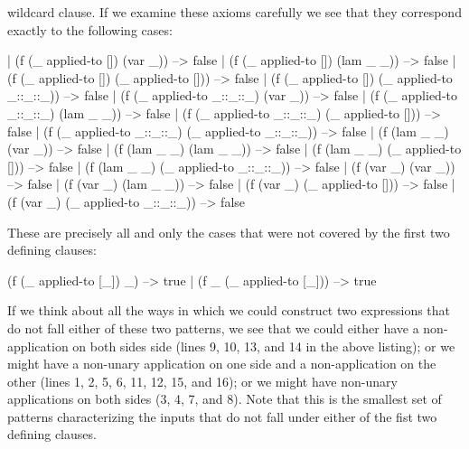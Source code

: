 wildcard clause. If we examine these axioms carefully we see that 
they correspond exactly to the following cases: 
\begin{tcAthena}
          | (f (_ applied-to []) (var _)) --> false 
          | (f (_ applied-to []) (lam _ _)) --> false
          | (f (_ applied-to []) (_ applied-to [])) --> false
          | (f (_ applied-to []) (_ applied-to _::_::_)) --> false
          | (f (_ applied-to _::_::_) (var _)) --> false
          | (f (_ applied-to _::_::_) (lam _ _)) --> false
          | (f (_ applied-to _::_::_) (_ applied-to [])) --> false
          | (f (_ applied-to _::_::_) (_ applied-to _::_::_)) --> false
          | (f (lam _ _) (var _)) --> false
          | (f (lam _ _) (lam _ _)) --> false
          | (f (lam _ _) (_ applied-to [])) --> false
          | (f (lam _ _) (_ applied-to _::_::_)) --> false
          | (f (var _) (var _)) --> false
          | (f (var _) (lam _ _)) --> false
          | (f (var _) (_ applied-to [])) --> false
          | (f (var _) (_ applied-to _::_::_)) --> false
\end{tcAthena}
These are precisely all and only the cases that were not
covered by the first two defining clauses: 
\begin{tcAthena}
            (f (_ applied-to [_]) _) --> true
          | (f _ (_ applied-to [_])) --> true
\end{tcAthena}
If we think about all the ways in which we could construct two
expressions that do not fall either of these two patterns, we see
that we could either have a non-application on both sides 
side (lines 9, 10, 13, and 14 in the above listing); 
or we might have a non-unary application on one side 
and a non-application on the other (lines 1, 2, 5, 6, 11, 
12, 15, and 16); or we might have non-unary applications
on both sides (3, 4, 7, and 8). Note that this is the 
smallest set of patterns
characterizing the inputs that do not fall under either of  
the fist two  defining clauses. 

